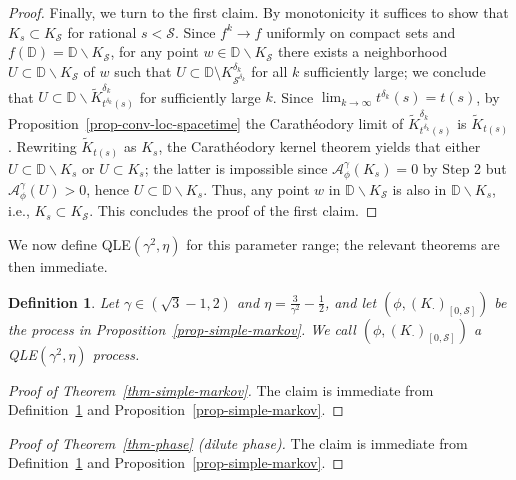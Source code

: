 \documentclass[a4paper]{article}
\numberwithin{equation}{section}
\newcommand{\D}{\mathbb{D}}
\newcommand{\cA}{\mathcal{A}}
\newcommand{\qduration}{\mathcal{S}}
\newtheorem{definition}[theorem]{Definition}
\theoremstyle{remark}
\numberwithin{equation}{section}
\begin{document}
\begin{proof}
  Finally, we turn to the first claim. By monotonicity it suffices to show that $K_s \subset K_\qduration$ for rational $s < \qduration$. Since $f^k \to f$ uniformly on compact sets and $f(\D) = \D \backslash K_\qduration$, for any point $w \in \D \backslash K_\qduration$ there exists a neighborhood $U \subset \D \backslash K_\qduration$ of $w$ such that $U \subset \D \setminus K_{\qduration^{\delta_k}}^{\delta_k}$ for all $k$ sufficiently large; we conclude that $U \subset \D \backslash \tilde K^{\delta_k}_{t^{\delta_k}(s)}$ for sufficiently large $k$.
    Since $\lim_{k\to\infty} t^{\delta_k}(s) = t(s)$, by Proposition~\ref{prop-conv-loc-spacetime} the Carath\'eodory limit of $\tilde K^{\delta_k}_{t^{\delta_k}(s)}$ is $\tilde K_{t(s)}$. Rewriting $\tilde K_{t(s)}$ as $K_s$, the Carath\'eodory kernel theorem yields that either $U \subset \D \backslash K_s$ or $U \subset K_s$; the latter is impossible since $\cA^\gamma_\phi(K_s) = 0$ by Step 2 but $\cA^\gamma_\phi(U) > 0$, hence $U \subset \D \backslash K_s$. Thus, any point $w$ in $\D \backslash K_\qduration$ is also in $\D \backslash K_s$, i.e., $K_s \subset K_\qduration$. This concludes the proof of the first claim. 
\end{proof}


We now define QLE$(\gamma^2, \eta)$ for this parameter range; the relevant theorems are then immediate. 

\begin{definition}\label{def-qle-simple}
Let $\gamma \in (\sqrt3 - 1, 2)$ and $\eta = \frac{3}{\gamma^2} - \frac12$, and let $(\phi, (K_\cdot)_{[0,\qduration]})$ be the process in Proposition~\ref{prop-simple-markov}. We call $(\phi, (K_\cdot)_{[0,\qduration]})$ a QLE$(\gamma^2, \eta)$ process. 
\end{definition}

\begin{proof}[{Proof of Theorem~\ref{thm-simple-markov}}]
    The claim is immediate from Definition~\ref{def-qle-simple} and Proposition~\ref{prop-simple-markov}.
\end{proof}

\begin{proof}[{Proof of Theorem~\ref{thm-phase} (dilute phase)}]
The claim is immediate from Definition~\ref{def-qle-simple} and Proposition~\ref{prop-simple-markov}.
\end{proof}
\end{document}

